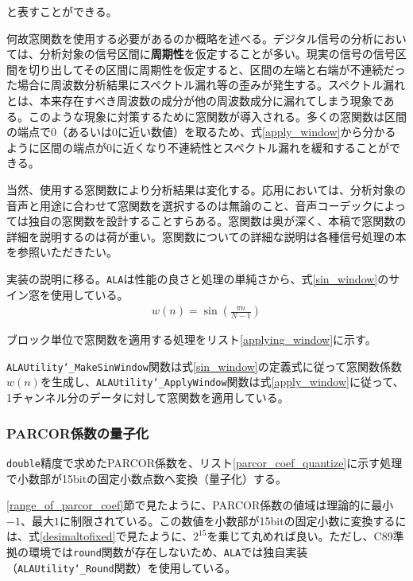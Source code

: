 \documentclass[uplatex,dvipdfmx,b5j,10pt]{jsbook}
\theoremstyle{definition}
\begin{document}
と表すことができる。

何故窓関数を使用する必要があるのか概略を述べる。デジタル信号の分析においては、分析対象の信号区間に\textbf{周期性}を仮定することが多い。現実の信号の信号区間を切り出してその区間に周期性を仮定すると、区間の左端と右端が不連続だった場合に周波数分析結果にスペクトル漏れ等の歪みが発生する\cite{digitalfourioranalysis}。スペクトル漏れとは、本来存在すべき周波数の成分が他の周波数成分に漏れてしまう現象である。このような現象に対策するために窓関数が導入される。多くの窓関数は区間の端点で0（あるいは0に近い数値）を取るため、式\ref{apply_window}から分かるように区間の端点が0に近くなり不連続性とスペクトル漏れを緩和することができる。

当然、使用する窓関数により分析結果は変化する。応用においては、分析対象の音声と用途に合わせて窓関数を選択するのは無論のこと、音声コーデックによっては独自の窓関数を設計することすらある\cite{vorbis}。窓関数は奥が深く、本稿で窓関数の詳細を説明するのは荷が重い。窓関数についての詳細な説明は各種信号処理の本を参照いただきたい\cite{sounddsp1st, sounddsp2nd, digitalfourioranalysis, linearpredict}。

実装の説明に移る。\texttt{ALA}は性能の良さと処理の単純さから、式\ref{sin_window}のサイン窓を使用している。
\begin{eqnarray} 
  w(n) = \sin\left( \frac{\pi n}{N-1} \right) \label{sin_window}
\end{eqnarray}

ブロック単位で窓関数を適用する処理をリスト\ref{applying_window}に示す。


\texttt{ALAUtility\char`_MakeSinWindow}関数は式\ref{sin_window}の定義式に従って窓関数係数$w(n)$を生成し、\texttt{ALAUtility\char`_ApplyWindow}関数は式\ref{apply_window}に従って、1チャンネル分のデータに対して窓関数を適用している。

\subsubsection{PARCOR係数の量子化}

\texttt{double}精度で求めたPARCOR係数を、リスト\ref{parcor_coef_quantize}に示す処理で小数部が15bitの固定小数点数へ変換（量子化）する。


\ref{range_of_parcor_coef}節で見たように、PARCOR係数の値域は理論的に最小$-1$、最大$1$に制限されている。この数値を小数部が15bitの固定小数に変換するには、式\ref{desimaltofixed}で見たように、$2^{15}$を乗じて丸めれば良い。ただし、C89準拠の環境では\texttt{round}関数が存在しないため、\texttt{ALA}では独自実装（\texttt{ALAUtility\char`_Round}関数）を使用している。
\end{document}
